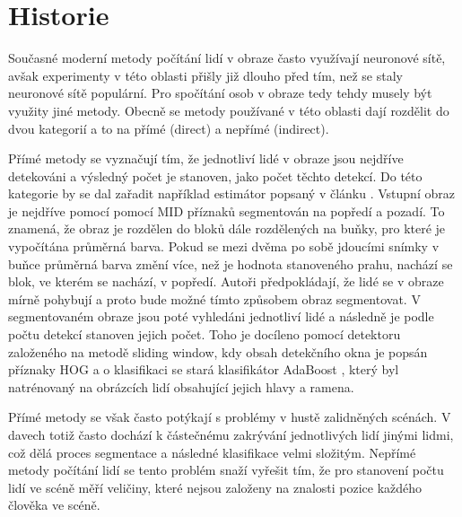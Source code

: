 \chapter{Historie}
\label{sec:History}
Současné moderní metody počítání lidí v obraze často využívají neuronové sítě, avšak experimenty v této oblasti přišly již dlouho před tím, než se staly neuronové sítě populární.
Pro spočítání osob v obraze tedy tehdy musely být využity jiné metody.
Obecně se metody používané v této oblasti dají rozdělit do dvou kategorií a to na přímé (direct) a nepřímé (indirect). \cite{crowd_on_pets}

Přímé metody se vyznačují tím, že jednotliví lidé v obraze jsou nejdříve detekováni a výsledný počet je stanoven, jako počet těchto detekcí.
Do této kategorie by se dal zařadit například estimátor popsaný v článku \cite{head_and_shoulders}.
Vstupní obraz je nejdříve pomocí pomocí MID příznaků segmentován na popředí a pozadí.
To znamená, že obraz je rozdělen do bloků dále rozdělených na buňky, pro které je vypočítána průměrná barva. Pokud se mezi dvěma po sobě jdoucími snímky v buňce průměrná barva změní více, než je hodnota stanoveného prahu, nachází se blok, ve kterém se nachází, v popředí.
Autoři předpokládají, že lidé se v obraze mírně pohybují a proto bude možné tímto způsobem obraz segmentovat.
V segmentovaném obraze jsou poté vyhledáni jednotliví lidé a následně je podle počtu detekcí stanoven jejich počet.
Toho je docíleno pomocí detektoru založeného na metodě sliding window, kdy obsah detekčního okna je popsán příznaky HOG a o klasifikaci se stará klasifikátor AdaBoost \cite{AdaBoost}, který byl natrénovaný na obrázcích lidí obsahující jejich hlavy a ramena.

Přímé metody se však často potýkají s problémy v hustě zalidněných scénách.
V davech totiž často dochází k částečnému zakrývání jednotlivých lidí jinými lidmi, což dělá proces segmentace a následné klasifikace velmi složitým.
Nepřímé metody počítání lidí se tento problém snaží vyřešit tím, že pro stanovení počtu lidí ve scéně 
měří veličiny, které nejsou založeny na znalosti pozice každého člověka ve scéně.

